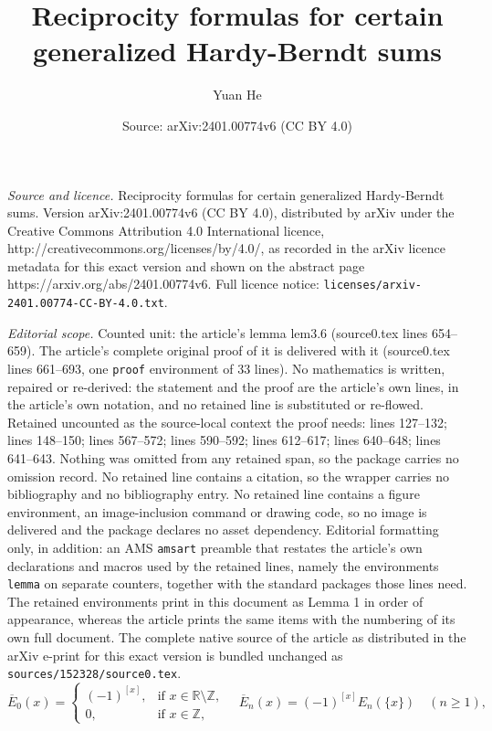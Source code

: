 \documentclass[10pt,a4paper]{amsart}
\title{Reciprocity formulas for certain generalized Hardy-Berndt sums}
\author{Yuan He}
\date{Source: arXiv:2401.00774v6 (CC BY 4.0)}
\begin{document}
\maketitle

\noindent\emph{Source and licence.} Reciprocity formulas for certain generalized Hardy-Berndt sums. Version arXiv:2401.00774v6 (CC BY 4.0), distributed by arXiv under the Creative Commons Attribution 4.0 International licence, http://creativecommons.org/licenses/by/4.0/, as recorded in the arXiv licence metadata for this exact version and shown on the abstract page https://arxiv.org/abs/2401.00774v6. Full licence notice: \texttt{licenses/arxiv-2401.00774-CC-BY-4.0.txt}.\par\smallskip

\noindent\textit{Editorial scope.} Counted unit: the article's lemma lem3.6 (source0.tex lines 654--659). The article's complete original proof of it is delivered with it (source0.tex lines 661--693, one \texttt{proof} environment of 33 lines). No mathematics is written, repaired or re-derived: the statement and the proof are the article's own lines, in the article's own notation, and no retained line is substituted or re-flowed.  Retained uncounted as the source-local context the proof needs: lines 127--132; lines 148--150; lines 567--572; lines 590--592; lines 612--617; lines 640--648; lines 641--643.  Nothing was omitted from any retained span, so the package carries no omission record.  No retained line contains a citation, so the wrapper carries no bibliography and no bibliography entry.  No retained line contains a figure environment, an image-inclusion command or drawing code, so no image is delivered and the package declares no asset dependency.  Editorial formatting only, in addition: an AMS \texttt{amsart} preamble that restates the article's own declarations and macros used by the retained lines, namely the environments \texttt{lemma} on separate counters, together with the standard packages those lines need.  The retained environments print in this document as Lemma 1 in order of appearance, whereas the article prints the same items with the numbering of its own full document.  The complete native source of the article as distributed in the arXiv e-print for this exact version is bundled unchanged as \texttt{sources/152328/source0.tex}.
\begin{equation}\label{eq1.13}
\overline{E}_{0}(x)=\begin{cases}
(-1)^{[x]},  &\text{if $x\in\mathbb{R}\setminus\mathbb{Z}$},\\
0,  &\text{if $x\in\mathbb{Z}$},
\end{cases} \quad\overline{E}_{n}(x)=(-1)^{[x]}E_{n}(\{x\})\quad(n\geq1),
\end{equation}
\end{document}
